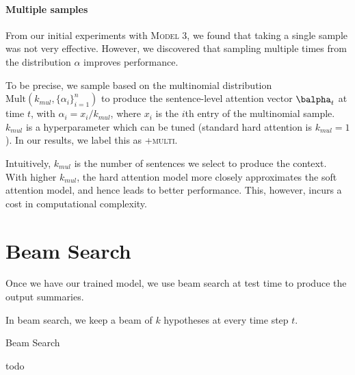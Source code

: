 \documentclass[12pt]{report}
\begin{document}
\paragraph{Multiple samples} 
From our initial experiments with \textsc{Model 3}, we found that taking a single sample was not very effective. However, we discovered that sampling multiple times from the distribution $\alpha$ improves performance.

To be precise, we sample based on the multinomial distribution $\mathrm{Mult}(k_{mul}, \{\alpha_i\}_{i=1}^n)$ to produce the sentence-level attention vector $\balpha_t$ at time $t$, with $\alpha_i = x_i / k_{mul}$, where $x_i$ is the $i$th entry of the multinomial sample. $k_{mul}$ is a hyperparameter which can be tuned (standard hard attention is $k_{mul} = 1$). In our results, we label this as \textsc{+multi}.

Intuitively, $k_{mul}$ is the number of sentences we select to produce the context. With higher $k_{mul}$, the hard attention model more closely approximates the soft attention model, and hence leads to better performance. This, however, incurs a cost in computational complexity.

\section{Beam Search}

Once we have our trained model, we use beam search at test time to produce the output summaries.

In beam search, we keep a beam of $k$ hypotheses at every time step $t$. 

\begin{algorithm}[b]
\caption{Beam Search}
\label{alg:beam_search}
\begin{algorithmic}
\State todo
\end{algorithmic}
\end{algorithm}



\end{document}

